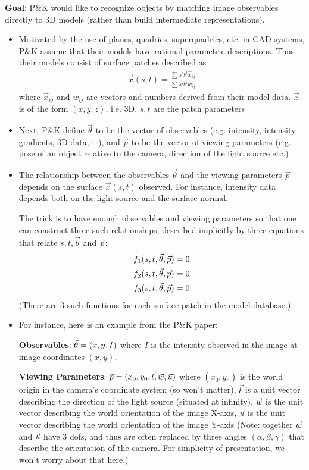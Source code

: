 \begin{example}
  \textbf{Goal}: P\&K would like to recognize objects by matching
  image observables directly to 3D models (rather than build
  intermediate representations).

  \begin{itemize}
  \item Motivated by the use of planes, quadrics, superquadrics, etc. in CAD
  systems, P\&K assume that their models have rational parametric
  descriptions. Thus their models consist of surface patches described
  as
  \begin{align*}
    \vec{x}(s, t) = \frac{\sum s^it^j \vec{x}_{ij}}{\sum s^it^j w_{ij}}
  \end{align*}
  where $\vec{x}_{ij}$ and $w_{ij}$ are vectors and numbers derived
  from their model data. $\vec{x}$ is of the form $(x, y, z)$,
  i.e. $3$D. $s, t$ are the patch parameters
\item Next, P\&K define $\vec{\theta}$ to be the vector of observables
  (e.g. intensity, intensity gradients, 3D data, $\cdots$), and
  $\vec{p}$ to be the vector of viewing parameters (e.g. pose of an
  object relative to the camera, direction of the light source etc.)
\item The relationship between the observables $\vec{\theta}$ and the
  viewing parameters $\vec{p}$ depends on the surface $\vec{x}(s, t)$
  observed. For instance, intensity data depends both on the light
  source and the surface normal.

  The trick is to have enough observables and viewing parameters so
  that one can construct three such relationships, described
  implicitly by three equations that relate $s, t, \vec{\theta}$ and
  $\vec{p}$:
  \begin{align*}
    f_1(s, t, \vec{\theta}, \vec{p}) &= 0 \\
    f_2(s, t, \vec{\theta}, \vec{p}) &= 0 \\
    f_3(s, t, \vec{\theta}, \vec{p}) &= 0
  \end{align*}
  (There are $3$ such functions for each surface patch in the model
  database.)
\item For instance, here is an example from the P\&K paper:

  \textbf{Observables}: $\vec{\theta} = (x, y, I)$ where $I$ is the
  intensity observed in the image at image coordinates $(x, y)$.

  \textbf{Viewing Parameters}: $\vec{p} = (x_0, y_0, \vec{l}, \vec{w},
  \vec{u})$ where $(x_0, y_0)$ is the world origin in the camera's
  coordinate system (so won't matter), $\vec{l}$ is a unit vector
  describing the direction of the light source (situated at infinity),
  $\vec{w}$ is the unit vector describing the world orientation of the
  image X-axis, $\vec{u}$ is the unit vector describing the world
  orientation of the image Y-axis (Note: together $\vec{w}$ and $\vec{u}$
  have 3 dofs, and thus are often replaced by three angles $(\alpha,
  \beta, \gamma)$ that describe the orientation of the camera. For
  simplicity of presentation, we won't worry about that here.)


\end{itemize}
\end{example}
